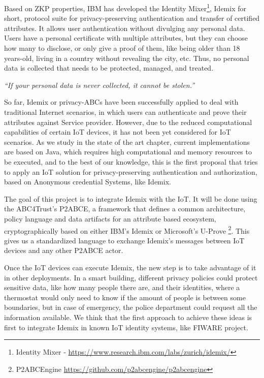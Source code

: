 Based on ZKP properties, IBM has developed the Identity Mixer\footnote{Identity Mixer - \url{https://www.research.ibm.com/labs/zurich/idemix/}}, Idemix for short, protocol suite for privacy-preserving authentication and transfer of certified attributes. It allows user authentication without divulging any personal data. Users have a personal certificate with multiple attributes, but they can choose how many to disclose, or only give a proof of them, like being older than 18 years-old, living in a country without revealing the city, etc. Thus, no personal data is collected that needs to be protected, managed, and treated.

\begin{center}
	\textit{``If your personal data is never collected, it cannot be stolen.''}
\end{center}

So far, Idemix or privacy-ABCs have been successfully applied to deal with traditional Internet scenarios, in which users can authenticate and prove their attributes against Service provider. However, due to the reduced computational capabilities of certain IoT devices, it has not been yet considered for IoT scenarios. As we study in the state of the art chapter, current implementations are based on Java, which requires high computational and memory resources to be executed, and to the best of our knowledge, this is the first proposal that tries to apply an IoT solution for privacy-preserving authentication and authorization, based on Anonymous credential Systems, like Idemix.


The goal of this project is to integrate Idemix with the IoT. It will be done using the ABC4Trust's \acf{P2ABCE}, a framework that defines a common architecture, policy language and data artifacts for an attribute based ecosystem, cryptographically based on either IBM's Idemix or Microsoft's U-Prove \footnote{P2ABCEngine \url{https://github.com/p2abcengine/p2abcengine}}. This gives us a standardized language to exchange Idemix's messages between IoT devices and any other P2ABCE actor.

Once the IoT devices can execute Idemix, the new step is to take advantage of it in other deployments. In a smart building, different privacy policies could protect sensitive data, like how many people there are, and their identities, where a thermostat would only need to know if the amount of people is between some boundaries, but in case of emergency, the police department could request all the information available. We think that the first approach to achieve these ideas is first to integrate Idemix in known IoT identity systems, like FIWARE project. 

